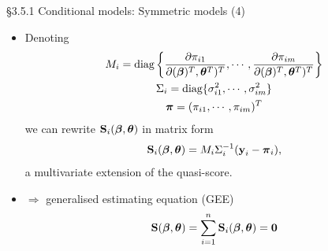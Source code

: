\documentclass{beamer}
\newenvironment{wideitemize}%
  {\begin{itemize}%
    \setlength{\parskip}{1em}}%
  {\end{itemize}}
\begin{document}
%
%

\begin{frame}{\S3.5.1 Conditional models: Symmetric models (4)}
\begin{wideitemize}
\item
Denoting 
\begin{multline*}
M_i=\text{diag}\left\{
\frac{\partial \pi_{i1}}{\partial ({\boldsymbol \beta})^T, {\boldsymbol \theta}^T)^T},
 \cdots, 
 \frac{\partial \pi_{im}}{\partial ({\boldsymbol \beta})^T, {\boldsymbol \theta}^T)^T}
 \right\}\\
 \Sigma_i=\mbox{diag}\{\sigma_{i1}^2,\cdots, \sigma_{im}^2\}\\
 \mbox{\boldmath $\pi$}=(\pi_{i1},\cdots, \pi_{im})^T
\end{multline*}
we can rewrite 
$\textbf{S}_i(\mbox{\boldmath $\beta$}, \mbox{\boldmath $\theta$})$ in matrix form
$$\textbf{S}_i(\mbox{\boldmath $\beta$}, \mbox{\boldmath $\theta$})=M_i\Sigma_i^{-1}
(\textbf{y}_i-\mbox{\boldmath $\pi$}_i),$$ a multivariate extension of the quasi-score. 
\item
$\Rightarrow $
generalised estimating equation (GEE)
$$\textbf{S}(\mbox{\boldmath $\beta$}, \mbox{\boldmath $\theta$})=\sum_{i=1}^n
\textbf{S}_i(\mbox{\boldmath $\beta$}, \mbox{\boldmath $\theta$})=\textbf{0}$$
\end{wideitemize}
\end{frame}
\end{document}

